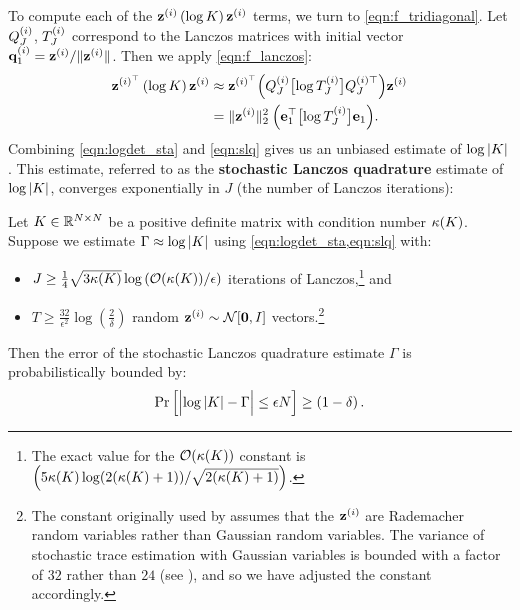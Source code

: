 To compute each of the $\mathbf{z}^{(i)} \left( \log K \right) \mathbf{z}^{(i)}$ terms, we turn to \cref{eqn:f_tridiagonal}.
Let $Q_J^{(i)}$, $T_J^{(i)}$ correspond to the Lanczos matrices with initial vector $\mathbf{q}^{(i)}_1 = \mathbf{z}^{(i)} / \Vert \mathbf{z}^{(i)} \Vert$.
Then we apply \cref{eqn:f_lanczos}:
%
\begin{align}
  \mathbf{z}^{(i)^\top} \left( \log K \right) \mathbf{z}^{(i)}
  &\approx \mathbf{z}^{(i)^\top} \Bigl( Q^{(i)}_J \bigl[ \log T^{(i)}_J \bigr] Q^{(i)\top}_J \Bigr) \mathbf{z}^{(i)}
  \nonumber
  \\
  &= \Vert \mathbf{z}^{(i)} \Vert^2_2 \: \Bigl( \mathbf{e}_{1}^{\top} \bigl[ \log T^{(i)}_J \bigr] \mathbf{e}_{1} \Bigr).
  \label{eqn:slq}
\end{align}
%
Combining \cref{eqn:logdet_sta} and \cref{eqn:slq} gives us an unbiased estimate of $\log \vert K \vert$.
This estimate, referred to as the {\bf stochastic Lanczos quadrature} estimate of $\log \vert K \vert$, converges exponentially in $J$ (the number of Lanczos iterations):
%
\begin{theorem}
  \label{thm:slq_convergence}
  Let $K \in \mathbb{R}^{N \times N}$ be a positive definite matrix with condition number $\kappa( K )$.
	Suppose we estimate $\Gamma \approx \log \vert K \vert$ using \cref{eqn:logdet_sta,eqn:slq} with:
	\begin{itemize}
		\item $J \geq \frac{1}{4} \sqrt{ 3 \kappa(\bK) } \log \left( \bigo{\kappa(\bK)} / \epsilon \right)$ iterations of Lanczos,\footnote{
			The exact value for the $\bigo{\kappa(\bK)}$ constant is $\left( 5 \kappa(K) \log ( 2 (\kappa(K) + 1)) / \sqrt{ 2(\kappa(K) + 1) } \right)$.
		} and
		\item $T \geq \frac{32}{\epsilon^2} \log \left( \frac 2 \delta \right)$ random $\bz^{(i)} \sim \normaldist{\bzero}{\bI}$ vectors.\footnote{
			The constant originally used by \citet{ubaru2017fast} assumes that the $\mathbf{z}^{(i)}$ are Rademacher random variables rather than Gaussian random variables.
			The variance of stochastic trace estimation with Gaussian variables is bounded with a factor of $32$ rather than $24$ (see \citep[][Eqs. 4 and 5]{roosta2015improved}), and so we have adjusted the constant accordingly.
		}
	\end{itemize}
  Then the error of the stochastic Lanczos quadrature estimate $\Gamma$ is probabilistically bounded by:
  \begin{equation*}
    \textrm{Pr}\left[\Bigl\vert \log \vert K \vert - \Gamma \Bigr\vert \leq \epsilon N \right] \geq \left( 1 - \delta \right).
  \end{equation*}
\end{theorem}

